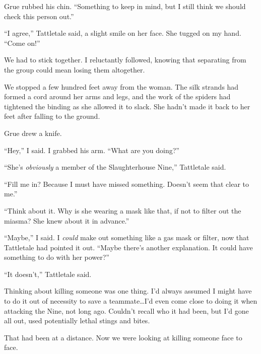 Grue rubbed his chin.  ``Something to keep in mind, but I still think we should check this person out.''



``I agree,'' Tattletale said, a slight smile on her face.  She tugged on my hand.  ``Come on!''



We had to stick together.  I reluctantly followed, knowing that separating from the group could mean losing them altogether.



We stopped a few hundred feet away from the woman.  The silk strands had formed a cord around her arms and legs, and the work of the spiders had tightened the binding as she allowed it to slack.  She hadn't made it back to her feet after falling to the ground.



Grue drew a knife.



``Hey,'' I said.  I grabbed his arm.  ``What are you doing?''



``She's \emph{obviously} a member of the Slaughterhouse Nine,'' Tattletale said.



``Fill me in?  Because I must have missed something.  Doesn't seem that clear to me.''



``Think about it.  Why is she wearing a mask like that, if not to filter out the miasma?  She knew about it in advance.''



``Maybe,'' I said.  I\emph{ could }make out something like a gas mask or filter, now that Tattletale had pointed it out.\emph{  }``Maybe there's another explanation.  It could have something to do with her power?''



``It doesn't,'' Tattletale said.



Thinking about killing someone was one thing.  I'd always assumed I might have to do it out of necessity to save a teammate\ldots I'd even come close to doing it when attacking the Nine, not long ago.  Couldn't recall who it had been, but I'd gone all out, used potentially lethal stings and bites.



That had been at a distance.  Now we were looking at killing someone face to face.



